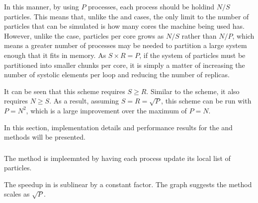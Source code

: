 %
In this manner, by using $P$ processes, each process should be holdind
$N/S$ particles.
%
This means that, unlike the \replicateddata{} and \sharedandreplicateddata{}
cases, the only limit to the number of particles that can be simulated
is how many cores the machine being used has.
%
However, unlike the \systolicloop{} case, particles per core grows as
$N/S$ rather than $N/P$, which means a greater number of processes
may be needed to partition a large system enough that it fits in memory.
%
As $S \times{} R = P$,
if the system of particles must be partitioned into
smaller chunks per core,
it is simply a matter of
increasing the number of systolic elements per loop and
reducing the number of replicas.

It can be seen that this scheme requires $S \ge{} R$.
%
Similar to the \systolicloop{} scheme, it also requires $N \ge{} S$.
%
As a result, assuming $S = R = \sqrt{P}$, this scheme can be run
with $P = N^2$, which is a large improvement over the \systolicloop{}
maximum of $P = N$.

In this section, implementation details and performance results
for the \individualoperation{} and \pairoperation{} methods will
be presented.


\subsubsection{\individualoperation{}}

The \individualoperation{} method is impleemnted by having each process
update its local list of particles.

%
%
\begin{figure}[!h]
    
    \caption{
        \vZeroSpeedupCaption
            {\replicatedsystolicloop{}}
            {\individualoperation{}}
    }
    \label{fig:v1_replicated_systolic_loop_individual_operation_speedups}
\end{figure}


\vZeroSpeedupExplanation
    {}
    {\replicatedsystolicloop{}}
    {\individualoperation{}}

%

The speedup in
is sublinear by a constant factor.
%
The graph suggests the method scales as $\sqrt{P}$.


